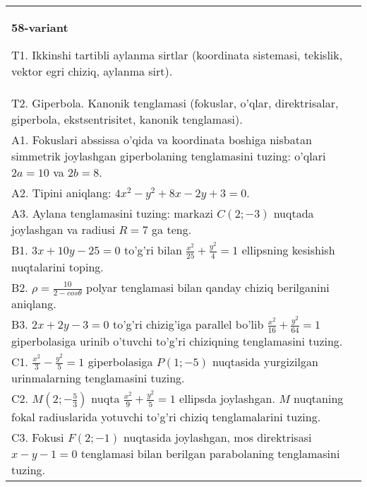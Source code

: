 \documentclass{article}
\begin{document}
\begin{tabular}{m{17cm}}
\textbf{58-variant}
\newline

T1. Ikkinshi tartibli aylanma sirtlar (koordinata sistemasi, tekislik, vektor egri chiziq, aylanma sirt).\\

T2. Giperbola. Kanonik tenglamasi (fokuslar, o'qlar, direktrisalar, giperbola, ekstsentrisitet, kanonik tenglamasi).\\

A1. Fokuslari abssissa o'qida va koordinata boshiga nisbatan simmetrik joylashgan giperbolaning tenglamasini tuzing: o'qlari $2a=10$ va $2b=8$.\\

A2. Tipini aniqlang: $4x^{2}-y^{2}+8x-2y+3=0$.\\

A3. Aylana tenglamasini tuzing: markazi $C(2;-3)$ nuqtada joylashgan va radiusi $R=7$ ga teng.\\

B1. $3x + 10y - 25 = 0$ to'g'ri bilan $\frac{x^{2}}{25} + \frac{y^{2}}{4} = 1$ ellipsning kesishish nuqtalarini toping.  \\

B2. $\rho = \frac{10}{2 - cos\theta}$ polyar tenglamasi bilan qanday chiziq berilganini aniqlang.  \\

B3. $2x + 2y - 3 = 0$ to'g'ri chizig'iga parallel bo'lib $\frac{x^{2}}{16} + \frac{y^{2}}{64} = 1$ giperbolasiga urinib o'tuvchi to'g'ri chiziqning tenglamasini tuzing.  \\

C1. $\frac{x^{2}}{3} - \frac{y^{2}}{5} = 1$ giperbolasiga $P(1; - 5)$ nuqtasida yurgizilgan urinmalarning tenglamasini tuzing.\\

C2. $M(2; - \frac{5}{3})$ nuqta $\frac{x^{2}}{9} + \frac{y^{2}}{5} = 1$ ellipsda joylashgan. $M$ nuqtaning fokal radiuslarida yotuvchi to'g'ri chiziq tenglamalarini tuzing.  \\

C3. Fokusi $F(2; - 1)$ nuqtasida joylashgan, mos direktrisasi $x - y - 1 = 0$ tenglamasi bilan berilgan parabolaning tenglamasini tuzing.  \\

\end{tabular}
\vspace{1cm}
\end{document}
